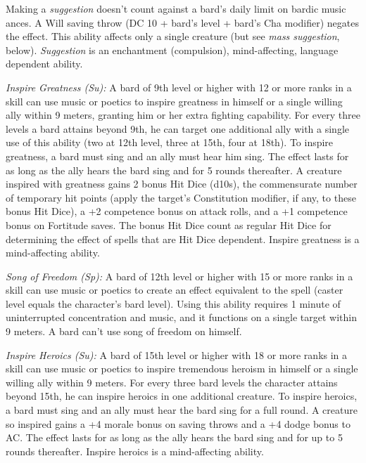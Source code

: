 Making a \emph{suggestion} doesn't count against a bard's daily limit on bardic music ances. A Will saving throw (DC 10 + \onehalf bard's level + bard's Cha modifier) negates the effect. This ability affects only a single creature (but see \emph{mass suggestion}, below). \emph{Suggestion} is an enchantment (compulsion), mind-affecting, language dependent ability.

\textit{Inspire Greatness (Su):} A bard of 9th level or higher with 12 or more ranks in a  skill can use music or poetics to inspire greatness in himself or a single willing ally within 9 meters, granting him or her extra fighting capability. For every three levels a bard attains beyond 9th, he can target one additional ally with a single use of this ability (two at 12th level, three at 15th, four at 18th). To inspire greatness, a bard must sing and an ally must hear him sing. The effect lasts for as long as the ally hears the bard sing and for 5 rounds thereafter. A creature inspired with greatness gains 2 bonus Hit Dice (d10s), the commensurate number of temporary hit points (apply the target's Constitution modifier, if any, to these bonus Hit Dice), a +2 competence bonus on attack rolls, and a +1 competence bonus on Fortitude saves. The bonus Hit Dice count as regular Hit Dice for determining the effect of spells that are Hit Dice dependent. Inspire greatness is a mind-affecting ability.

\textit{Song of Freedom (Sp):} A bard of 12th level or higher with 15 or more ranks in a  skill can use music or poetics to create an effect equivalent to the  spell (caster level equals the character's bard level). Using this ability requires 1 minute of uninterrupted concentration and music, and it functions on a single target within 9 meters. A bard can't use song of freedom on himself.


\textit{Inspire Heroics (Su):} A bard of 15th level or higher with 18 or more ranks in a  skill can use music or poetics to inspire tremendous heroism in himself or a single willing ally within 9 meters. For every three bard levels the character attains beyond 15th, he can inspire heroics in one additional creature. To inspire heroics, a bard must sing and an ally must hear the bard sing for a full round. A creature so inspired gains a +4 morale bonus on saving throws and a +4 dodge bonus to AC. The effect lasts for as long as the ally hears the bard sing and for up to 5 rounds thereafter. Inspire heroics is a mind-affecting ability.

